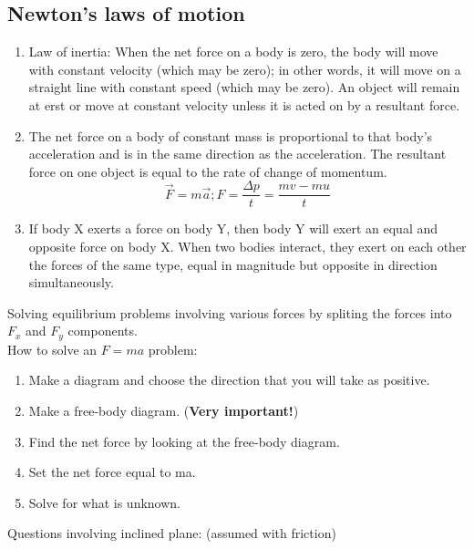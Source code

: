 \subsection{Newton's laws of motion}
\begin{enumerate}
  \item Law of inertia: When the net force on a body is zero, the body will move with constant velocity (which may be zero); in other words, it will move on a straight line with constant speed (which may be zero). An object will remain at erst or move at constant velocity unless it is acted on by a resultant force.
  \item The net force on a body of constant mass is proportional to that body's acceleration and is in the same direction as the acceleration. The resultant force on one object is equal to the rate of change of momentum. \[\vec{F}=m\vec{a}; F=\dfrac{\Delta p}{t}=\dfrac{mv-mu}{t}\]
  \item If body X exerts a force on body Y, then body Y will exert an equal and opposite force on body X. When two bodies interact, they exert on each other the forces of the same type, equal in magnitude but opposite in direction simultaneously.
\end{enumerate}
Solving equilibrium problems involving various forces by spliting the forces into $F_x$ and $F_y$ components.\\
How to solve an $F=ma$ problem:
\begin{enumerate}
  \item Make a diagram and choose the direction that you will take as positive. 
  \item Make a free-body diagram. (\textbf{Very important!})
  \item Find the net force by looking at the free-body diagram.
  \item Set the net force equal to ma.
  \item Solve for what is unknown.
\end{enumerate}
Questions involving inclined plane: (assumed with friction)
